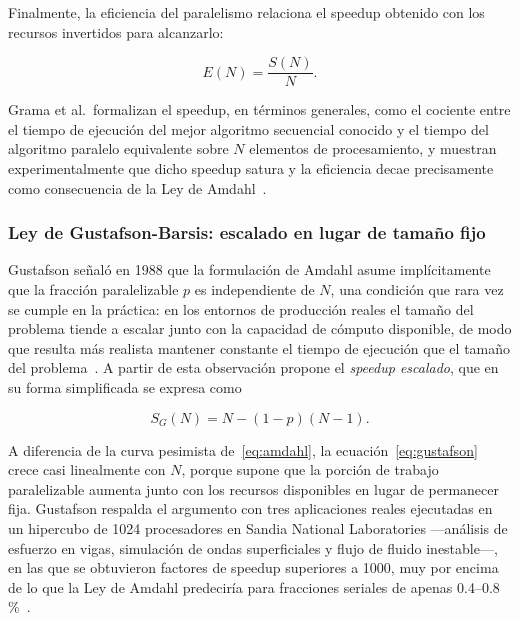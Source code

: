 \documentclass[11pt,a4paper]{article}
\begin{document}
    Finalmente, la eficiencia del paralelismo relaciona el speedup
    obtenido con los recursos invertidos para alcanzarlo:

    \begin{equation}
        E(N) = \frac{S(N)}{N}.
        \label{eq:eficiencia}
    \end{equation}

    Grama et al.\ formalizan el speedup, en términos generales, como el
    cociente entre el tiempo de ejecución del mejor algoritmo secuencial
    conocido y el tiempo del algoritmo paralelo equivalente sobre $N$
    elementos de procesamiento, y muestran experimentalmente que dicho
    speedup satura y la eficiencia decae precisamente como consecuencia de
    la Ley de Amdahl~\autocite{grama2003,amdahl1967}.

    \subsubsection{Ley de Gustafson-Barsis: escalado en lugar de tamaño fijo}

    Gustafson señaló en 1988 que la formulación de Amdahl asume
    implícitamente que la fracción paralelizable $p$ es independiente de
    $N$, una condición que rara vez se cumple en la práctica: en los
    entornos de producción reales el tamaño del problema tiende a escalar
    junto con la capacidad de cómputo disponible, de modo que resulta más
    realista mantener constante el tiempo de ejecución que el tamaño del
    problema~\autocite{gustafson1988}. A partir de esta observación propone el
    \emph{speedup escalado}, que en su forma simplificada se expresa como

    \begin{equation}
        S_G(N) = N - (1-p)(N-1).
        \label{eq:gustafson}
    \end{equation}

    A diferencia de la curva pesimista de~\eqref{eq:amdahl}, la
    ecuación~\eqref{eq:gustafson} crece casi linealmente con $N$, porque
    supone que la porción de trabajo paralelizable aumenta junto con los
    recursos disponibles en lugar de permanecer fija. Gustafson respalda
    el argumento con tres aplicaciones reales ejecutadas en un hipercubo
    de 1024 procesadores en Sandia National Laboratories —análisis de
    esfuerzo en vigas, simulación de ondas superficiales y flujo de fluido
    inestable—, en las que se obtuvieron factores de speedup superiores a
    1000, muy por encima de lo que la Ley de Amdahl predeciría para
    fracciones seriales de apenas 0.4--0.8\,\%~\autocite{gustafson1988}.
\end{document}
